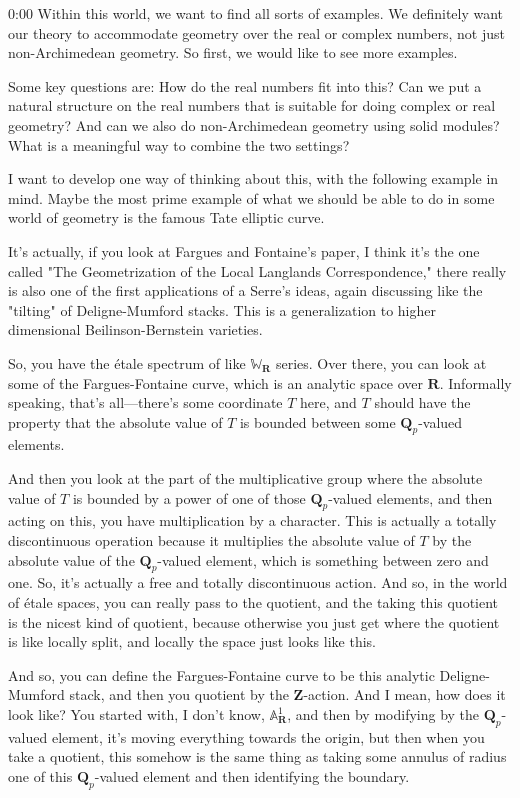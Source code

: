 \begin{unfinished}{0:00}
Within this world, we want to find all sorts of examples. We definitely want our theory to accommodate geometry over the real or complex numbers, not just non-Archimedean geometry. So first, we would like to see more examples.

Some key questions are: How do the real numbers fit into this? Can we put a natural structure on the real numbers that is suitable for doing complex or real geometry? And can we also do non-Archimedean geometry using solid modules? What is a meaningful way to combine the two settings?

I want to develop one way of thinking about this, with the following example in mind. Maybe the most prime example of what we should be able to do in some world of geometry is the famous Tate elliptic curve.

It's actually, if you look at Fargues and Fontaine's paper, I think it's the one called "The Geometrization of the Local Langlands Correspondence," there really is also one of the first applications of a Serre's ideas, again discussing like the "tilting" of Deligne-Mumford stacks. This is a generalization to higher dimensional Beilinson-Bernstein varieties.

So, you have the étale spectrum of like $\mathbb{W}_{\mathbf{R}}$ series. Over there, you can look at some of the Fargues-Fontaine curve, which is an analytic space over $\mathbf{R}$. Informally speaking, that's all---there's some coordinate $T$ here, and $T$ should have the property that the absolute value of $T$ is bounded between some $\mathbf{Q}_p$-valued elements. 

And then you look at the part of the multiplicative group where the absolute value of $T$ is bounded by a power of one of those $\mathbf{Q}_p$-valued elements, and then acting on this, you have multiplication by a character. This is actually a totally discontinuous operation because it multiplies the absolute value of $T$ by the absolute value of the $\mathbf{Q}_p$-valued element, which is something between zero and one. So, it's actually a free and totally discontinuous action. And so, in the world of étale spaces, you can really pass to the quotient, and the taking this quotient is the nicest kind of quotient, because otherwise you just get where the quotient is like locally split, and locally the space just looks like this.

And so, you can define the Fargues-Fontaine curve to be this analytic Deligne-Mumford stack, and then you quotient by the $\mathbf{Z}$-action. And I mean, how does it look like? You started with, I don't know, $\mathbb{A}^1_{\mathbf{R}}$, and then by modifying by the $\mathbf{Q}_p$-valued element, it's moving everything towards the origin, but then when you take a quotient, this somehow is the same thing as taking some annulus of radius one of this $\mathbf{Q}_p$-valued element and then identifying the boundary.


\end{unfinished}
